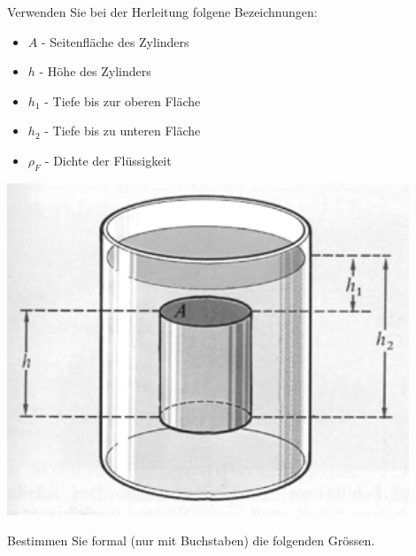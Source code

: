 \documentclass[11pt]{article}
\begin{document}
\begin{minipage}{0.65\textwidth}
Verwenden Sie bei der Herleitung folgene Bezeichnungen:
\begin{itemize}
    \item $A$ - Seitenfläche des Zylinders
    \item $h$ - Höhe des Zylinders
    \item $h_1$ - Tiefe bis zur oberen Fläche
    \item $h_2$ - Tiefe bis zu unteren Fläche 
    \item $\rho_F$ - Dichte der Flüssigkeit
\end{itemize}
\end{minipage}
\begin{minipage}{0.35\textwidth}
    \begin{flushright}
        \includegraphics[width=0.9\textwidth]{images/Herleitung_Auftrieb_bw.png}
    \end{flushright}
\end{minipage}

Bestimmen Sie formal (nur mit Buchstaben) die folgenden Grössen. 
\end{document}
